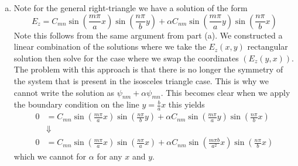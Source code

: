 \documentclass[11pt]{article}
\numberwithin{equation}{section}
\begin{document}
\begin{enumerate}[(a)]
\item
    Note for the general right-triangle we have a solution of the form 
    $$E_z = C_{mn}\sin\left(\frac{m\pi}{a}x\right)\sin\left(\frac{n\pi}{b}y\right) + \alpha C_{nm}\sin\left(\frac{m\pi}{a}y\right)\sin\left(\frac{n\pi}{b}x\right)$$
    Note this follows from the same argument from part (a). We constructed a linear combination of the solutions where
    we take the $E_z(x,y)$ rectangular solution then solve for the case where we swap the coordinates $(E_z(y,x))$. 
    The problem with this approach is that there is no longer the symmetry of the system that is present in the 
    isosceles triangle case. This is why we cannot write the solution as $\psi_{nm}+\alpha\psi_{mn}$.
    This becomes clear when we apply the boundary condition on the line $y=\frac{b}{a}x$ this yields 
    \begin{align*}
        0 &= C_{mn}\sin\left(\frac{m\pi}{a}x\right)\sin\left(\frac{n\pi}{b}y\right) + \alpha C_{nm}\sin\left(\frac{m\pi}{a}y\right)\sin\left(\frac{n\pi}{b}x\right)\\
          &\Downarrow\\
        0 &= C_{mn}\sin\left(\frac{m\pi}{a}x\right)\sin\left(\frac{n\pi}{a}x\right) + \alpha C_{nm}\sin\left(\frac{m\pi b}{a^2}x\right)\sin\left(\frac{n\pi}{b}x\right)
    \end{align*}
    which we cannot for $\alpha$ for any $x$ and $y$.


\end{enumerate}
\end{document}
